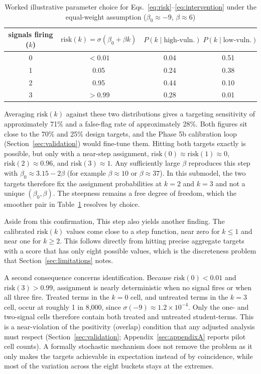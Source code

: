 \documentclass[11pt]{article}
\begin{document}
\begin{table}[ht]
\caption{Worked illustrative parameter choice for Eqs.~\ref{eq:risk}--\ref{eq:intervention} under the equal-weight assumption ($\beta_0\approx-9$, $\beta\approx6$)}
\label{tab:worked}
\centering
\small
\begin{tabular}{@{}cccc@{}}
\toprule
signals firing ($k$) & $\text{risk}(k)=\sigma(\beta_0+\beta k)$ & $P(k \mid \text{high-vuln.})$ & $P(k \mid \text{low-vuln.})$ \\
\midrule
0 & $<0.01$ & 0.04 & 0.51 \\
1 & 0.05 & 0.24 & 0.38 \\
2 & 0.95 & 0.44 & 0.10 \\
3 & $>0.99$ & 0.28 & 0.01 \\
\bottomrule
\end{tabular}
\end{table}

Averaging $\text{risk}(k)$ against these two distributions gives a targeting sensitivity of approximately 71\% and a false-flag rate of approximately 28\%. Both figures sit close to the 70\% and 25\% design targets, and the Phase 5b calibration loop (Section~\ref{sec:validation}) would fine-tune them. Hitting both targets exactly is possible, but only with a near-step assignment, $\text{risk}(0) \approx \text{risk}(1) \approx 0$, $\text{risk}(2) \approx 0.96$, and $\text{risk}(3) \approx 1$. Any sufficiently large $\beta$ reproduces this step with $\beta_0 \approx 3.15 - 2\beta$ (for example $\beta \approx 10$ or $\beta \approx 37$). In this submodel, the two targets therefore fix the assignment probabilities at $k=2$ and $k=3$ and not a unique $(\beta_0,\beta)$. The steepness remains a free degree of freedom, which the smoother pair in Table~\ref{tab:worked} resolves by choice.

Aside from this confirmation, This step also yields another finding. The calibrated $\text{risk}(k)$ values come close to a step function, near zero for $k \le 1$ and near one for $k \ge 2$. This follows directly from hitting precise aggregate targets with a score that has only eight possible values, which is the discreteness problem that Section~\ref{sec:limitations} notes.

A second consequence concerns identification. Because $\text{risk}(0) < 0.01$ and $\text{risk}(3) > 0.99$, assignment is nearly deterministic when no signal fires or when all three fire. Treated terms in the $k=0$ cell, and untreated terms in the $k=3$ cell, occur at roughly 1 in 8,000, since $\sigma(-9) \approx 1.2 \times 10^{-4}$. Only the one- and two-signal cells therefore contain both treated and untreated student-terms. This is a near-violation of the positivity (overlap) condition that any adjusted analysis must respect (Section~\ref{sec:validation}; Appendix~\ref{sec:appendixA} reports pilot cell counts). A formally stochastic mechanism does not remove the problem as it only makes the targets achievable in expectation instead of by coincidence, while most of the variation across the eight buckets stays at the extremes.
\end{document}
